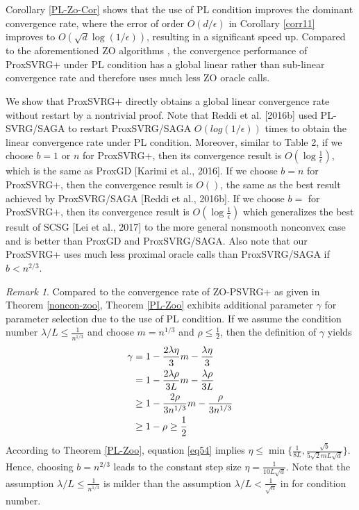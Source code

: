 \documentclass{article}
\theoremstyle{definition}
\theoremstyle{remark}
\newtheorem{remark}[theorem]{Remark}
\begin{document}
Corollary \ref{PL-Zo-Cor} shows that the use of PL condition improves the dominant convergence rate, where the error of
order $O(d/\epsilon)$ in Corollary \ref{corr11} improves to $O(\sqrt{d}\log(1/\epsilon))$, resulting in a significant speed up.
{\color{Brown}
 Compared to the aforementioned ZO algorithms \cite{duchi2015optimal,nesterov2017random,liu2018zeroth}, the convergence performance of ProxSVRG+ under PL condition has a global linear rather than sub-linear convergence rate and therefore  uses much less ZO oracle calls. 
}

{\color{Violet}
We show that ProxSVRG+ directly obtains a global linear convergence rate without restart by a nontrivial proof. Note that Reddi et al. [2016b] used PL-SVRG/SAGA to restart ProxSVRG/SAGA $O(log(1/\epsilon))$ times to obtain
the linear convergence rate under PL condition.
Moreover, similar to Table 2, if we choose $b = 1$ or $n$ for ProxSVRG+, then its convergence result is $O(\log \frac{1}{\epsilon})$,
which is the same as ProxGD [Karimi et al., 2016]. If we choose $b = n$ for ProxSVRG+, then the convergence result is $O()$, the same as the best result achieved by ProxSVRG/SAGA [Reddi et al., 2016b]. If we
choose $b = $ for ProxSVRG+, then its convergence result is $O(\log\frac{1}{\epsilon})$
which generalizes the best result of SCSG [Lei et al., 2017] to the more general nonsmooth nonconvex case and is better than ProxGD and ProxSVRG/SAGA. Also note that our ProxSVRG+ uses much less proximal oracle calls than ProxSVRG/SAGA if $b < n ^{2/3}$.

}

\begin{remark}
Compared to the convergence rate of ZO-PSVRG+ as given in Theorem \ref{noncon-zoo}, Theorem \ref{PL-Zoo} exhibits additional parameter $\gamma$ for parameter selection due to the use of PL condition. 
If we assume the condition number $\lambda/L\leq \frac{1}{n^{1/3}}$ and choose $m = n^{1/3}$ and $\rho\leq \frac{1}{2}$, then the definition of $\gamma$ yields  
\begin{align}
\gamma &= 1-\frac{2\lambda\eta}{3} m-\frac{\lambda\eta}{3}\notag \\
& = 1 - \frac{2\lambda\rho}{3L}m - \frac{\lambda\rho}{3L}\notag\\
& \geq  1 - \frac{2\rho}{3n^{1/3}}m - \frac{\rho}{3n^{1/3}}\notag\\
& \geq  1 - \rho \geq \frac{1}{2}\label{eq54}
\end{align}
According to Theorem \ref{PL-Zoo}, equation \eqref{eq54} implies $\eta \leq \min\{\frac{1}{8L}, \frac{\sqrt{b}}{5\sqrt{2} m L \sqrt{d}}\}$. 
Hence, choosing $b = n^{2/3}$ leads to the constant step size  $\eta = \frac{1}{10 L \sqrt{d}}$.
Note that the assumption $\lambda/L \leq \frac{1}{{n}^{1/3}}$ is milder than the assumption $\lambda/L < \frac{1}{\sqrt{n}}$ in \cite{reddi2016proximal} for condition number.
\end{remark}
\end{document}
